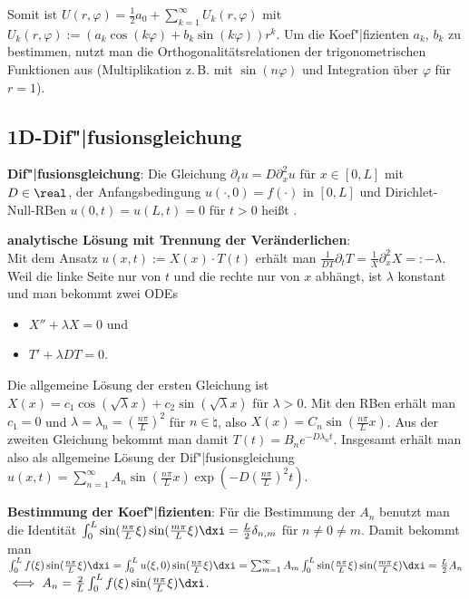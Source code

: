 Somit ist $U(r, \varphi) = \frac{1}{2} a_0 + \sum_{k=1}^\infty U_k(r, \varphi)$ mit
$U_k(r, \varphi) := (a_k \cos(k \varphi) + b_k \sin(k \varphi)) r^k$.
Um die Koef"|fizienten $a_k$, $b_k$ zu bestimmen, nutzt man die Orthogonalitätsrelationen
der trigonometrischen Funktionen aus
(Multiplikation z.\,B. mit $\sin(n\varphi)$ und Integration über $\varphi$ für $r = 1$).

\subsection{%
    1D-Dif"|fusionsgleichung%
}

\textbf{Dif"|fusionsgleichung}:
Die Gleichung $\partial_t u = D \partial_x^2 u$ für $x \in [0, L]$ mit $D \in \real$,
der Anfangsbedingung $u(\cdot, 0) = f(\cdot)$ in $[0, L]$ und
Dirichlet-Null-RBen $u(0, t) = u(L, t) = 0$ für $t > 0$ heißt .

\textbf{analytische Lösung mit Trennung der Veränderlichen}:\\
Mit dem Ansatz $u(x, t) := X(x) \cdot T(t)$ erhält man
$\frac{1}{DT} \partial_t T = \frac{1}{X} \partial_x^2 X =: -\lambda$.
Weil die linke Seite nur von $t$ und die rechte nur von $x$ abhängt, ist $\lambda$ konstant und
man bekommt zwei ODEs
\begin{itemize}
    \item
    $X'' + \lambda X = 0$ und

    \item
    $T' + \lambda DT = 0$.
\end{itemize}
Die allgemeine Lösung der ersten Gleichung ist
$X(x) = c_1 \cos(\sqrt{\lambda} x) + c_2 \sin(\sqrt{\lambda} x)$ für $\lambda > 0$.
Mit den RBen erhält man $c_1 = 0$ und $\lambda = \lambda_n = (\frac{n \pi}{L})^2$ für
$n \in \natural$, also $X(x) = C_n \sin(\frac{n \pi}{L} x)$.
Aus der zweiten Gleichung bekommt man damit $T(t) = B_n e^{-D \lambda_n t}$.
Insgesamt erhält man also als allgemeine Lösung der Dif"|fusionsgleichung
$u(x, t) = \sum_{n=1}^\infty A_n \sin(\frac{n \pi}{L} x) \exp(-D (\frac{n \pi}{L})^2 t)$.

\textbf{Bestimmung der Koef"|fizienten}:
Für die Bestimmung der $A_n$ benutzt man die Identität
$\int_0^L \sin(\frac{n \pi}{L} \xi) \sin(\frac{m \pi}{L} \xi) \dxi = \frac{L}{2} \delta_{n,m}$
für $n \not= 0 \not= m$.
Damit bekommt man\\
$\int_0^L f(\xi) \sin(\frac{n \pi}{L} \xi) \dxi
= \int_0^L u(\xi, 0) \sin(\frac{n \pi}{L} \xi) \dxi
= \sum_{m=1}^\infty A_m \int_0^L \sin(\frac{n \pi}{L} \xi) \sin(\frac{m \pi}{L} \xi) \dxi
= \frac{L}{2} A_n$\\
$\iff A_n = \frac{2}{L} \int_0^L f(\xi) \sin(\frac{n \pi}{L} \xi) \dxi$.

